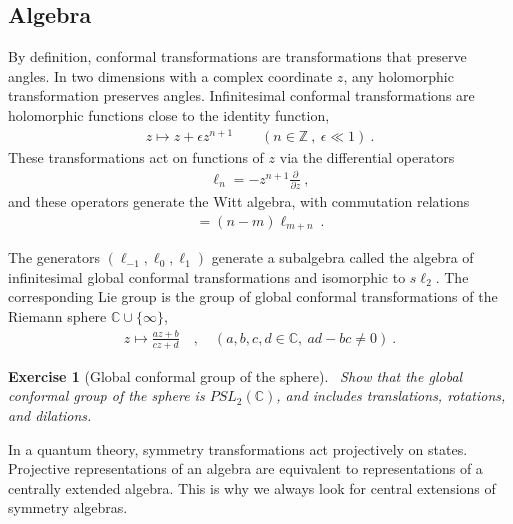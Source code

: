 \documentclass[12pt, a4paper]{article}
\theoremstyle{break}
\newtheorem{exo}{Exercise}[section]
\begin{document}
\subsection{Algebra}

By definition, conformal transformations are transformations that preserve angles. 
In two dimensions with a complex coordinate $z$, any holomorphic transformation preserves angles.
Infinitesimal conformal transformations are holomorphic functions close to the identity function, 
\begin{align}
 z \mapsto z + \epsilon z^{n+1}\qquad (n\in\mathbb{Z}\ , \ \epsilon\ll 1) \ .
\end{align}
These transformations act on functions of $z$ via the differential operators 
\begin{align}
 \ell_n = -z^{n+1}\frac{\partial}{\partial z}\ ,
\end{align}
and these operators generate the Witt algebra, with commutation relations
\begin{align}
 [\ell_n,\ell_m ] = (n-m)\ell_{m+n}\ .
\end{align}

\begin{tcolorbox}
The generators $(\ell_{-1},\ell_0,\ell_1)$ generate a subalgebra called the algebra of infinitesimal global conformal transformations and isomorphic to $s\ell_2$.  The corresponding Lie group is the group of global conformal transformations of 
the Riemann sphere $\mathbb{C}\cup \{\infty\}$,
\begin{align}
 z \mapsto \frac{az+b}{cz+d}\quad , \quad (a,b,c,d\in \mathbb{C},\ ad-bc\neq 0)\ .
\end{align}


\begin{exo}[Global conformal group of the sphere]
 ~\label{exo:sphere}
Show that the global conformal group of the sphere is $PSL_2(\mathbb{C})$, and includes translations, rotations, and dilations. 
\end{exo}
\end{tcolorbox}

In a quantum theory, symmetry transformations act projectively on states. 
Projective representations of an algebra are equivalent to representations of a centrally extended algebra. 
This is why we always look for central extensions of symmetry algebras.
\end{document}
